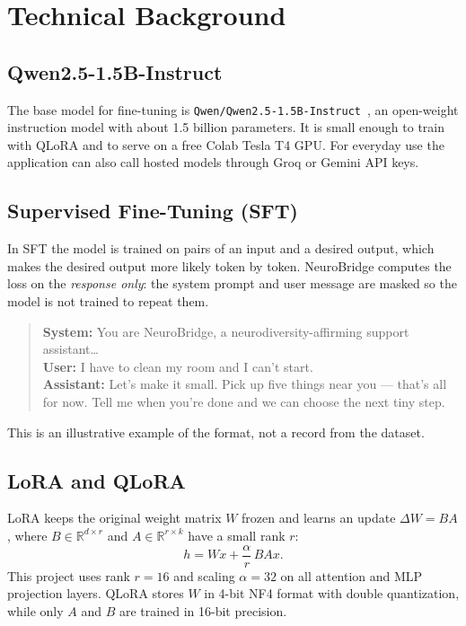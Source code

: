 \documentclass[11pt,a4paper]{article}
\newcommand{\code}[1]{\texttt{#1}}
\begin{document}
\section{Technical Background}\label{sec:background}

\subsection{Qwen2.5-1.5B-Instruct}
The base model for fine-tuning is \code{Qwen/Qwen2.5-1.5B-Instruct}~\cite{qwenhf,qwen25report}, an
open-weight instruction model with about 1.5 billion parameters. It is small enough to train with
QLoRA and to serve on a free Colab Tesla T4 GPU. For everyday use the application can also call hosted
models through Groq or Gemini API keys.

\subsection{Supervised Fine-Tuning (SFT)}
In SFT the model is trained on pairs of an input and a desired output, which makes the desired
output more likely token by token. NeuroBridge computes the loss on the \emph{response only}: the
system prompt and user message are masked so the model is not trained to repeat them.

\begin{quote}\small
\textbf{System:} You are NeuroBridge, a neurodiversity-affirming support assistant\ldots\\
\textbf{User:} I have to clean my room and I can't start.\\
\textbf{Assistant:} Let's make it small. Pick up five things near you --- that's all for now. Tell me when you're done and we can choose the next tiny step.
\end{quote}
This is an illustrative example of the format, not a record from the dataset.

\subsection{LoRA and QLoRA}
LoRA keeps the original weight matrix $W$ frozen and learns an update $\Delta W = BA$, where
$B\in\mathbb{R}^{d\times r}$ and $A\in\mathbb{R}^{r\times k}$ have a small rank $r$:
\begin{equation}
  h = Wx + \frac{\alpha}{r}\,BAx .
\end{equation}
This project uses rank $r=16$ and scaling $\alpha=32$ on all attention and MLP projection layers.
QLoRA stores $W$ in 4-bit NF4 format with double quantization, while only $A$ and $B$ are trained
in 16-bit precision.
\end{document}
